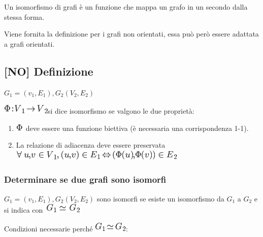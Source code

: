 \documentclass{article}
\providecommand{\tightlist}{%
  \setlength{\itemsep}{0pt}\setlength{\parskip}{0pt}}
\begin{document}
{{{{Un isomorfismo di grafi è un funzione che mappa un grafo in un secondo dalla stessa forma.}

{Viene fornita la definizione per i grafi non orientati, essa può però essere adattata a grafi orientati.}

\subsection{{[}NO{]} Definizione}

$G_1=(v_1,E_1),G_2(V_2,E_2)$

\includegraphics{images/image427.png}{si dice isomorfismo se valgono le due proprietà:}

\begin{enumerate}
\tightlist
\item
  \includegraphics{images/image428.png}{~deve essere una funzione biettiva (è necessaria una corrispondenza 1-1).}
\item
  {La relazione di adiacenza deve essere preservata\\
  }\includegraphics{images/image429.png}
\end{enumerate}

{}

\hypertarget{h.umjijdswjd6a}{\subsubsection{\texorpdfstring{{Determinare
se due grafi sono isomorfi}}{Determinare se due grafi sono isomorfi}}\label{h.umjijdswjd6a}}

{}

{$G_1=(v_1,E_1),G_2(V_2,E_2)$ sono isomorfi se esiste un isomorfismo da $G_1$ a $G_2$ e si indica con }\includegraphics{images/image432.png}


{Condizioni necessarie perché }\includegraphics{images/image433.png}{:}

}}}
\end{document}

